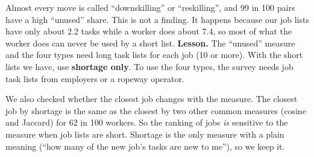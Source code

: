 \documentclass[11pt]{article}
\begin{document}
Almost every move is called ``downskilling'' or ``reskilling'', and 99 in 100 pairs have a high ``unused'' share.
This is not a finding. It happens because our job lists have only about 2.2 tasks while a worker does about 7.4, so most of what the worker does can never be used by a short list.
\textbf{Lesson.} The ``unused'' measure and the four types need long task lists for each job (10 or more). With the short lists we have, use \textbf{shortage only}. To use the four types, the survey needs job task lists from employers or a ropeway operator.

We also checked whether the closest job changes with the measure. The closest job by shortage is the same as the closest by two other common measures (cosine and Jaccard) for 62 in 100 workers.
So the ranking of jobs \emph{is} sensitive to the measure when job lists are short. Shortage is the only measure with a plain meaning (``how many of the new job's tasks are new to me''), so we keep it.
\end{document}
